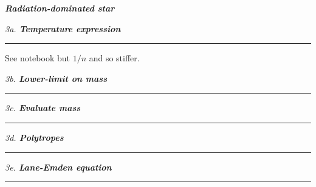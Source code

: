 \documentclass[12pt, letterpaper, twoside]{article}
\newcommand{\question}[1]{{\noindent \it #1}}
\newcommand{\answer}[1]{
    \par\noindent\rule{\textwidth}{0.4pt}#1\vspace{0.5cm}
}
\begin{document}
\question{\textbf{Radiation-dominated star}}

\question{3a. \textbf{Temperature expression}}
\answer{
    See notebook but $1/n$ and so stiffer.
}

\question{3b. \textbf{Lower-limit on mass}}
\answer{

}

\question{3c. \textbf{Evaluate mass}}
\answer{

}

\question{3d. \textbf{Polytropes}}
\answer{

}

\question{3e. \textbf{Lane-Emden equation}}
\answer{

}
\end{document}
